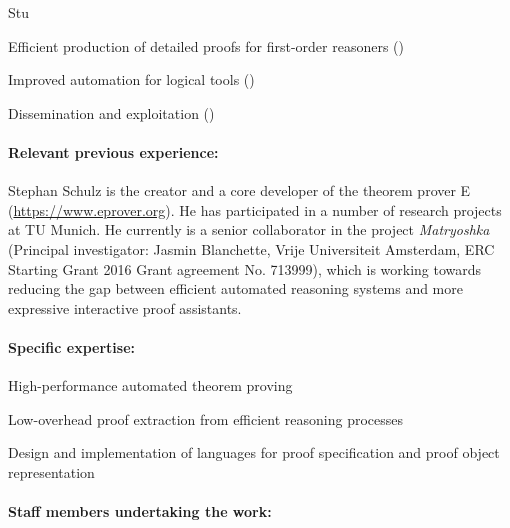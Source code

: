 \begin{sitedescription}{Stu}
\begin{compactitem}
\item Efficient production of detailed proofs for first-order
  reasoners ()
\item Improved automation for logical tools ()
\item Dissemination and exploitation ()
\end{compactitem}


\paragraph{Relevant previous experience:}

Stephan Schulz is the creator and a core developer of the theorem
prover E (\url{https://www.eprover.org}).  He has participated in a
number of research projects at TU Munich. He currently is a senior
collaborator in the project \emph{Matryoshka} (Principal investigator:
Jasmin Blanchette, Vrije Universiteit Amsterdam, ERC Starting Grant
2016 Grant agreement No. 713999), which is working towards reducing
the gap between efficient automated reasoning systems and more
expressive interactive proof assistants.

\paragraph{Specific expertise:}

\begin{compactitem}
\item High-performance automated theorem proving
\item Low-overhead proof extraction from efficient reasoning processes
\item Design and implementation of languages for proof specification
  and proof object representation
\end{compactitem}

\paragraph{Staff members undertaking the work:}



\end{sitedescription}
